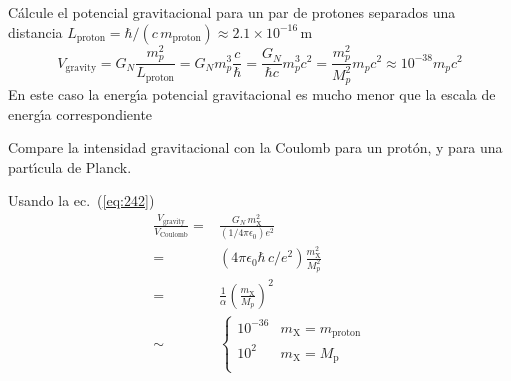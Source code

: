 \begin{example}
  C\'alcule el potencial gravitacional para un par de protones separados una distancia  $L_{\text{proton}}=\hbar/(c\, m_{\text{proton}})\approx2.1\times10^{-16}\,\text{m}$
\begin{equation}
    V_{\text{gravity}}=G_N\frac{m_p^2}{L_{\text{proton}}}=G_N m_p^3\frac{c}{\hbar}=\frac{G_N}{\hbar c}m_p^3c^2=\frac{m_p^2}{M_p^2}m_pc^2\approx10^{-38}m_pc^2
\end{equation}
En este caso la energ\'\i a potencial gravitacional es mucho menor que la escala de energ\'\i a correspondiente
\end{example}
\begin{example}
Compare la intensidad gravitacional con la Coulomb para un prot\'on, y para una part\'\i cula de Planck.

Usando la ec.~(\ref{eq:242})
\begin{align}
\frac{V_{\text{gravity}}}{V_{\text{Coulomb}}}=&\frac{G_N\,m_{\text{X}}^2}{(1/4\pi\epsilon_0)e^2}\nonumber\\
=&(4\pi\epsilon_0\hbar\,c/e^2)\frac{m_{\text{X}}^2}{M_p^2}\nonumber\\
=&\frac{1}{\alpha}\left(\frac{m_{\text{X}}}{M_p}\right)^2\nonumber\\
\sim&
\begin{cases}
  10^{-36}&m_{\text{X}}=m_{\text{proton}}\\
  10^{2}&m_{\text{X}}=M_{\text{p}}\\
\end{cases}
\end{align}
\end{example}



